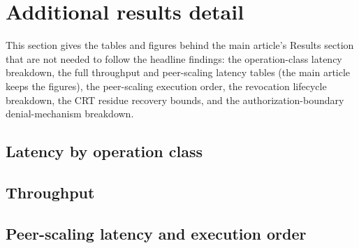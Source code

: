 \clearpage
\section{Additional results detail}
\label{sec:supp_results}

This section gives the tables and figures behind the main article's Results
section that are not needed to follow the headline findings: the
operation-class latency breakdown, the full throughput and peer-scaling
latency tables (the main article keeps the figures), the peer-scaling
execution order, the revocation lifecycle breakdown, the CRT residue
recovery bounds, and the authorization-boundary denial-mechanism breakdown.

\subsection{Latency by operation class}



\begin{widefig}
\centering
{}
\caption{Empirical CDFs of the two committed transaction classes. Both
  traverse ordering and commitment.}
\label{fig:cdf}
\end{widefig}

\subsection{Throughput}



\subsection{Peer-scaling latency and execution order}





